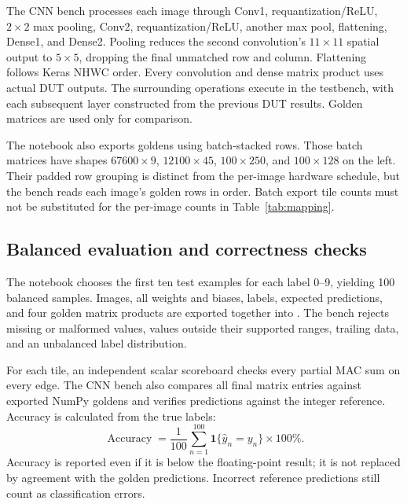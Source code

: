 \documentclass[10pt,twocolumn,letterpaper]{article}
\newcommand{\code}[1]{\texttt{\detokenize{#1}}}
\begin{document}
The CNN bench processes each image through Conv1, requantization/ReLU,
$2\times2$ max pooling, Conv2, requantization/ReLU, another max pool,
flattening, Dense1, and Dense2. Pooling reduces the second convolution's
$11\times11$ spatial output to $5\times5$, dropping the final unmatched row
and column. Flattening follows Keras NHWC order. Every convolution and dense
matrix product uses actual DUT outputs. The surrounding operations execute
in the testbench, with each subsequent layer constructed from the previous
DUT results. Golden matrices are used only for comparison.

The notebook also exports goldens using batch-stacked rows. Those batch
matrices have shapes $67600\times9$, $12100\times45$, $100\times250$, and
$100\times128$ on the left. Their padded row grouping is distinct from the
per-image hardware schedule, but the bench reads each image's golden rows
in order. Batch export tile counts must not be substituted for the
per-image counts in Table~\ref{tab:mapping}.

\subsection{Balanced evaluation and correctness checks}
The notebook chooses the first ten test examples for each label 0--9,
yielding 100 balanced samples. Images, all weights and biases, labels,
expected predictions, and four golden matrix products are exported together
into \code{modelsim_data}. The bench rejects missing or malformed values,
values outside their supported ranges, trailing data, and an unbalanced
label distribution.

For each tile, an independent scalar scoreboard checks every partial MAC
sum on every edge. The CNN bench also compares all final matrix entries
against exported NumPy goldens and verifies predictions against the integer
reference. Accuracy is calculated from the true labels:
\begin{equation}
\operatorname{Accuracy}=\frac{1}{100}\sum_{n=1}^{100}
\mathbf{1}\{\widehat y_n=y_n\}\times100\%.
\end{equation}
Accuracy is reported even if it is below the floating-point result; it is
not replaced by agreement with the golden predictions. Incorrect reference
predictions still count as classification errors.
\end{document}
